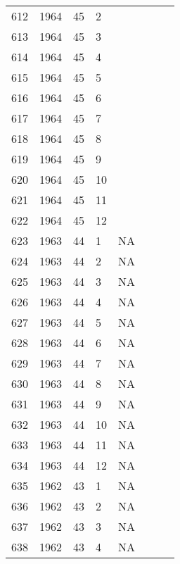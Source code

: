 \begin{longtable}{ |l|l|l|l|l|l|l|l| }
612 & 1964 & 45 &     2 &         &                &  & \\
613 & 1964 & 45 &     3 &         &                &  & \\
614 & 1964 & 45 &     4 &         &                &  & \\
615 & 1964 & 45 &     5 &         &                &  & \\
616 & 1964 & 45 &     6 &         &                &  & \\
617 & 1964 & 45 &     7 &         &                &  & \\
618 & 1964 & 45 &     8 &         &                &  & \\
619 & 1964 & 45 &     9 &         &                &  & \\
620 & 1964 & 45 &    10 &         &                &   & \\
621 & 1964 & 45 &    11 &         &                &  & \\
622 & 1964 & 45 &    12 &         &                &  & \\
623 & 1963 & 44 &     1 &      NA &                &  & \\
624 & 1963 & 44 &     2 &      NA &                &  & \\
625 & 1963 & 44 &     3 &      NA &                &  & \\
626 & 1963 & 44 &     4 &      NA &                &  & \\
627 & 1963 & 44 &     5 &      NA &                &  & \\
628 & 1963 & 44 &     6 &      NA &                &  & \\
629 & 1963 & 44 &     7 &      NA &                &  & \\
630 & 1963 & 44 &     8 &      NA &                &  & \\
631 & 1963 & 44 &     9 &      NA &                &  & \\
632 & 1963 & 44 &    10 &      NA &                &  & \\
633 & 1963 & 44 &    11 &      NA &                &  & \\
634 & 1963 & 44 &    12 &      NA &                &  & \\
635 & 1962 & 43 &     1 &      NA &                &  & \\
636 & 1962 & 43 &     2 &      NA &                &  & \\
637 & 1962 & 43 &     3 &      NA &                &  & \\
638 & 1962 & 43 &     4 &      NA &                &  & \\

\end{longtable}
